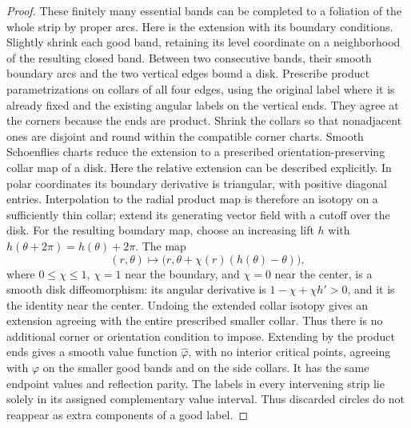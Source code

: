 \begin{proof}
These finitely many essential bands can be completed to a foliation of
the whole strip by proper arcs.  Here is the extension with its boundary
conditions.  Slightly shrink each good band, retaining its level
coordinate on a neighborhood of the resulting closed band.  Between
two consecutive bands, their smooth boundary arcs and the two vertical
edges bound a disk.  Prescribe product parametrizations on collars of
all four edges, using the original label where it is already fixed and
the existing angular labels on the vertical ends.  They agree at the
corners because the ends are product.  Shrink the collars so that
nonadjacent ones are disjoint and round within the compatible corner
charts.  Smooth Schoenflies charts reduce the extension to a prescribed
orientation-preserving collar map of a disk.  Here the relative
extension can be described explicitly.  In polar coordinates its
boundary derivative is triangular, with positive diagonal entries.
Interpolation to the radial product map is therefore an isotopy on a
sufficiently thin collar; extend its generating vector field with a
cutoff over the disk.  For the resulting boundary map, choose an
increasing lift $h$ with $h(\theta+2\pi)=h(\theta)+2\pi$.  The map
\[
 (r,\theta)\longmapsto
 \bigl(r,\theta+\chi(r)(h(\theta)-\theta)\bigr),
\]
where $0\le\chi\le1$, $\chi=1$ near the boundary, and $\chi=0$ near the center,
is a smooth disk diffeomorphism: its angular derivative is
$1-\chi+\chi h'>0$, and it is the identity near the center.
Undoing the extended collar isotopy gives an extension agreeing with
the entire prescribed smaller collar.  Thus there is no additional
corner or orientation condition to impose.  Extending by the product
ends gives a smooth value function $\widehat\varphi$, with no interior
critical points, agreeing with $\varphi$ on the smaller good bands and
on the side collars.  It has the same endpoint values and reflection parity.
The labels in every intervening strip lie solely in its assigned
complementary value interval.  Thus discarded circles do not reappear
as extra components of a good label.


\end{proof}
